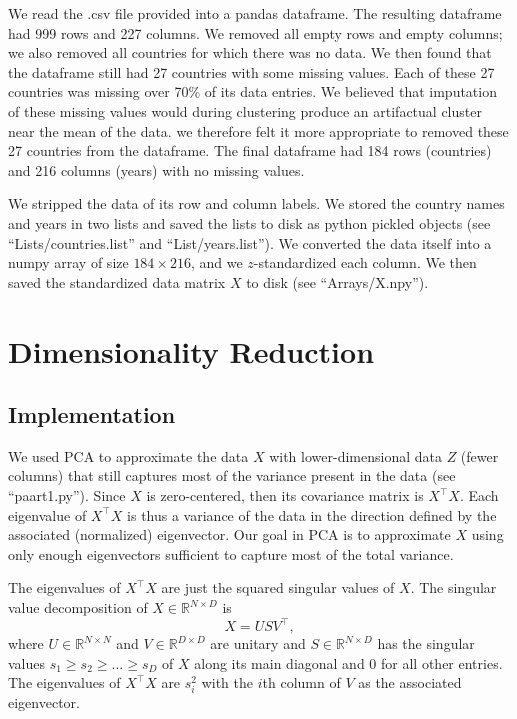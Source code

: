 \documentclass[12pt]{article}
\begin{document}
We read the .csv file provided into a pandas dataframe. The resulting dataframe had 999 rows and 227 columns. We removed all empty rows and empty columns; we also removed all countries for which there was no data. We then found that the dataframe still had 27 countries with some missing values. Each of these 27 countries was missing over 70\% of its data entries. We believed that imputation of these missing values would during clustering produce an artifactual cluster near the mean of the data. we therefore felt it more appropriate to removed these 27 countries from the dataframe. The final dataframe had 184 rows (countries) and 216 columns (years) with no missing values.

We stripped the data of its row and column labels. We stored the country names and years in two lists and saved the lists to disk as python pickled objects (see ``Lists/countries.list'' and ``List/years.list''). We converted the data itself into a numpy array of size $184\times 216$, and we $z$-standardized each column. We then saved the standardized data matrix $X$ to disk (see ``Arrays/X.npy'').


\section{Dimensionality Reduction}

\subsection{Implementation}

We used PCA to approximate the data $X$ with lower-dimensional data $Z$ (fewer columns) that still captures most of the variance present in the data (see ``paart1.py''). Since $X$ is zero-centered, then its covariance matrix is $X^\top X$. Each eigenvalue of $X^\top X$ is thus a variance of the data in the direction defined by the associated (normalized) eigenvector. Our goal in PCA is to approximate $X$ using only enough eigenvectors sufficient to capture most of the total variance.

The eigenvalues of $X^\top X$ are just the squared singular values of $X$. The singular value decomposition of $X\in\mathbb{R}^{N\times D}$ is
\[ X = U S V^\top, \]
where $U\in\mathbb{R}^{N\times N}$ and $V\in\mathbb{R}^{D\times D}$ are unitary and $S\in\mathbb{R}^{N\times D}$ has the singular values $s_1\geq s_2\geq\ldots \geq s_D$ of $X$ along its main diagonal and $0$ for all other entries. The eigenvalues of $X^\top X$ are $s_i^2$ with the $i$th column of $V$ as the associated eigenvector.
\end{document}

